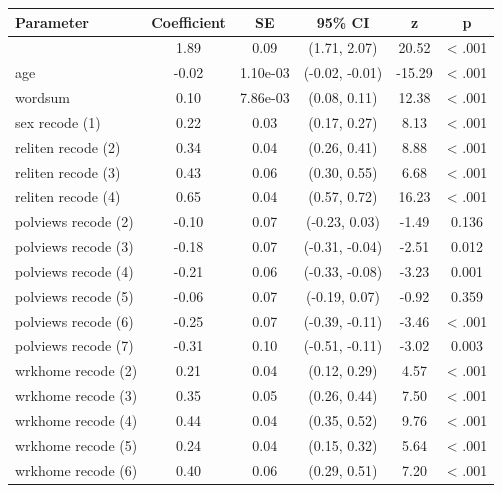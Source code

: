 \documentclass[
  letterpaper,
  DIV=11,
  numbers=noendperiod]{scrartcl}
\begin{document}
\begin{table}
\fontsize{12.0pt}{14.4pt}\selectfont
\begin{tabular*}{\linewidth}{@{\extracolsep{\fill}}lccccc}
\toprule
Parameter & Coefficient & SE & 95\% CI & z & p \\ 
\midrule\addlinespace[2.5pt]
{(Intercept)} & 1.89 & 0.09 & (1.71, 2.07) & 20.52 & < .001 \\ 
{age} & -0.02 & 1.10e-03 & (-0.02, -0.01) & -15.29 & < .001 \\ 
{wordsum} & 0.10 & 7.86e-03 & (0.08, 0.11) & 12.38 & < .001 \\ 
{sex recode (1)} & 0.22 & 0.03 & (0.17, 0.27) & 8.13 & < .001 \\ 
{reliten recode (2)} & 0.34 & 0.04 & (0.26, 0.41) & 8.88 & < .001 \\ 
{reliten recode (3)} & 0.43 & 0.06 & (0.30, 0.55) & 6.68 & < .001 \\ 
{reliten recode (4)} & 0.65 & 0.04 & (0.57, 0.72) & 16.23 & < .001 \\ 
{polviews recode (2)} & -0.10 & 0.07 & (-0.23, 0.03) & -1.49 & 0.136  \\ 
{polviews recode (3)} & -0.18 & 0.07 & (-0.31, -0.04) & -2.51 & 0.012  \\ 
{polviews recode (4)} & -0.21 & 0.06 & (-0.33, -0.08) & -3.23 & 0.001  \\ 
{polviews recode (5)} & -0.06 & 0.07 & (-0.19, 0.07) & -0.92 & 0.359  \\ 
{polviews recode (6)} & -0.25 & 0.07 & (-0.39, -0.11) & -3.46 & < .001 \\ 
{polviews recode (7)} & -0.31 & 0.10 & (-0.51, -0.11) & -3.02 & 0.003  \\ 
{wrkhome recode (2)} & 0.21 & 0.04 & (0.12, 0.29) & 4.57 & < .001 \\ 
{wrkhome recode (3)} & 0.35 & 0.05 & (0.26, 0.44) & 7.50 & < .001 \\ 
{wrkhome recode (4)} & 0.44 & 0.04 & (0.35, 0.52) & 9.76 & < .001 \\ 
{wrkhome recode (5)} & 0.24 & 0.04 & (0.15, 0.32) & 5.64 & < .001 \\ 
{wrkhome recode (6)} & 0.40 & 0.06 & (0.29, 0.51) & 7.20 & < .001 \\ 
\bottomrule
\end{tabular*}
\begin{minipage}{\linewidth}
\\
\end{minipage}
\end{table}
\end{document}
